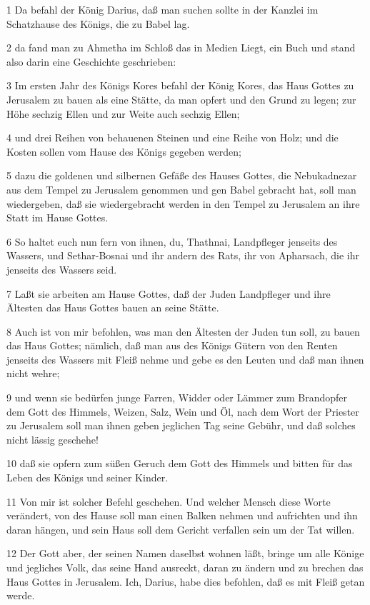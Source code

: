 \par 1 Da befahl der König Darius, daß man suchen sollte in der Kanzlei im Schatzhause des Königs, die zu Babel lag.
\par 2 da fand man zu Ahmetha im Schloß das in Medien Liegt, ein Buch und stand also darin eine Geschichte geschrieben:
\par 3 Im ersten Jahr des Königs Kores befahl der König Kores, das Haus Gottes zu Jerusalem zu bauen als eine Stätte, da man opfert und den Grund zu legen; zur Höhe sechzig Ellen und zur Weite auch sechzig Ellen;
\par 4 und drei Reihen von behauenen Steinen und eine Reihe von Holz; und die Kosten sollen vom Hause des Königs gegeben werden;
\par 5 dazu die goldenen und silbernen Gefäße des Hauses Gottes, die Nebukadnezar aus dem Tempel zu Jerusalem genommen und gen Babel gebracht hat, soll man wiedergeben, daß sie wiedergebracht werden in den Tempel zu Jerusalem an ihre Statt im Hause Gottes.
\par 6 So haltet euch nun fern von ihnen, du, Thathnai, Landpfleger jenseits des Wassers, und Sethar-Bosnai und ihr andern des Rats, ihr von Apharsach, die ihr jenseits des Wassers seid.
\par 7 Laßt sie arbeiten am Hause Gottes, daß der Juden Landpfleger und ihre Ältesten das Haus Gottes bauen an seine Stätte.
\par 8 Auch ist von mir befohlen, was man den Ältesten der Juden tun soll, zu bauen das Haus Gottes; nämlich, daß man aus des Königs Gütern von den Renten jenseits des Wassers mit Fleiß nehme und gebe es den Leuten und daß man ihnen nicht wehre;
\par 9 und wenn sie bedürfen junge Farren, Widder oder Lämmer zum Brandopfer dem Gott des Himmels, Weizen, Salz, Wein und Öl, nach dem Wort der Priester zu Jerusalem soll man ihnen geben jeglichen Tag seine Gebühr, und daß solches nicht lässig geschehe!
\par 10 daß sie opfern zum süßen Geruch dem Gott des Himmels und bitten für das Leben des Königs und seiner Kinder.
\par 11 Von mir ist solcher Befehl geschehen. Und welcher Mensch diese Worte verändert, von des Hause soll man einen Balken nehmen und aufrichten und ihn daran hängen, und sein Haus soll dem Gericht verfallen sein um der Tat willen.
\par 12 Der Gott aber, der seinen Namen daselbst wohnen läßt, bringe um alle Könige und jegliches Volk, das seine Hand ausreckt, daran zu ändern und zu brechen das Haus Gottes in Jerusalem. Ich, Darius, habe dies befohlen, daß es mit Fleiß getan werde.
